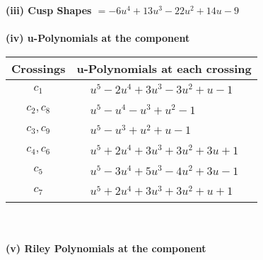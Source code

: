 \documentclass[1p]{elsarticle_modified}
\theoremstyle{definition}
\begin{document}
\flushleft \textbf{(iii) Cusp Shapes $= -6 u^4+13 u^3-22 u^2+14 u-9$}\\~\\
\newpage\renewcommand{\arraystretch}{1}
\flushleft \textbf{(iv) u-Polynomials at the component}\newline \\
\begin{tabular}{m{50pt}|m{274pt}}
Crossings & \hspace{64pt}u-Polynomials at each crossing \\
\hline $$\begin{aligned}c_{1}\end{aligned}$$&$\begin{aligned}
&u^5-2 u^4+3 u^3-3 u^2+u-1
\end{aligned}$\\
\hline $$\begin{aligned}c_{2},c_{8}\end{aligned}$$&$\begin{aligned}
&u^5- u^4- u^3+u^2-1
\end{aligned}$\\
\hline $$\begin{aligned}c_{3},c_{9}\end{aligned}$$&$\begin{aligned}
&u^5- u^3+u^2+u-1
\end{aligned}$\\
\hline $$\begin{aligned}c_{4},c_{6}\end{aligned}$$&$\begin{aligned}
&u^5+2 u^4+3 u^3+3 u^2+3 u+1
\end{aligned}$\\
\hline $$\begin{aligned}c_{5}\end{aligned}$$&$\begin{aligned}
&u^5-3 u^4+5 u^3-4 u^2+3 u-1
\end{aligned}$\\
\hline $$\begin{aligned}c_{7}\end{aligned}$$&$\begin{aligned}
&u^5+2 u^4+3 u^3+3 u^2+u+1
\end{aligned}$\\
\hline
\end{tabular}\\~\\
\newpage\renewcommand{\arraystretch}{1}
\flushleft \textbf{(v) Riley Polynomials at the component}\newline \\
\end{document}
